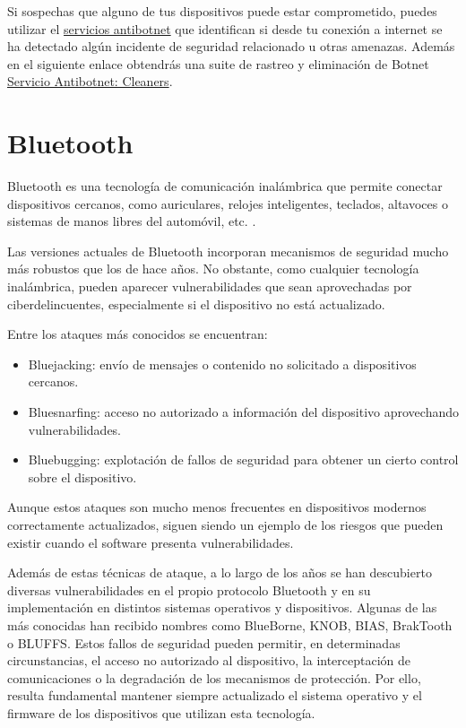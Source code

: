 \documentclass[
  spanish,
  a4paper,
  openany]{book}
\begin{document}
Si sospechas que alguno de tus dispositivos puede estar comprometido, puedes utilizar el \href{https://www.incibe.es/ciudadania/herramientas/servicio-antibotnet/}{servicios antibotnet} que identifican si desde tu conexión a internet se ha detectado algún incidente de seguridad relacionado u otras amenazas. Además en el siguiente enlace obtendrás una suite de rastreo y eliminación de Botnet \href{https://www.incibe.es/ciudadania/servicio-antibotnet/cleaners}{Servicio Antibotnet: Cleaners}.

\section{Bluetooth}\label{bluetooth}

Bluetooth es una tecnología de comunicación inalámbrica que permite conectar dispositivos cercanos, como auriculares, relojes inteligentes, teclados, altavoces o sistemas de manos libres del automóvil, etc. \citep{IONOS-bluetooh}.

Las versiones actuales de Bluetooth incorporan mecanismos de seguridad mucho más robustos que los de hace años. No obstante, como cualquier tecnología inalámbrica, pueden aparecer vulnerabilidades que sean aprovechadas por ciberdelincuentes, especialmente si el dispositivo no está actualizado.

Entre los ataques más conocidos se encuentran:

\begin{itemize}
\item
  Bluejacking: envío de mensajes o contenido no solicitado a dispositivos cercanos.
\item
  Bluesnarfing: acceso no autorizado a información del dispositivo aprovechando vulnerabilidades.
\item
  Bluebugging: explotación de fallos de seguridad para obtener un cierto control sobre el dispositivo.
\end{itemize}

Aunque estos ataques son mucho menos frecuentes en dispositivos modernos correctamente actualizados, siguen siendo un ejemplo de los riesgos que pueden existir cuando el software presenta vulnerabilidades.

Además de estas técnicas de ataque, a lo largo de los años se han descubierto diversas vulnerabilidades en el propio protocolo Bluetooth y en su implementación en distintos sistemas operativos y dispositivos. Algunas de las más conocidas han recibido nombres como BlueBorne, KNOB, BIAS, BrakTooth o BLUFFS. Estos fallos de seguridad pueden permitir, en determinadas circunstancias, el acceso no autorizado al dispositivo, la interceptación de comunicaciones o la degradación de los mecanismos de protección. Por ello, resulta fundamental mantener siempre actualizado el sistema operativo y el firmware de los dispositivos que utilizan esta tecnología.
\end{document}
